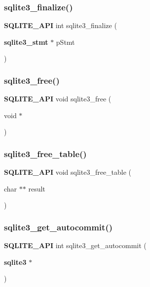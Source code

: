 \mbox{\label{sqlite3_8h_a801195c0f771d40bb4be1e40f3b88945}} 
\subsubsection{sqlite3\_finalize()}
{\footnotesize\ttfamily \textbf{ S\+Q\+L\+I\+T\+E\+\_\+\+A\+PI} int sqlite3\+\_\+finalize (\begin{DoxyParamCaption}\item[{\textbf{ sqlite3\+\_\+stmt} $\ast$}]{p\+Stmt }\end{DoxyParamCaption})}

\mbox{\label{sqlite3_8h_a6552349e36a8a691af5487999ab09519}} 
\subsubsection{sqlite3\_free()}
{\footnotesize\ttfamily \textbf{ S\+Q\+L\+I\+T\+E\+\_\+\+A\+PI} void sqlite3\+\_\+free (\begin{DoxyParamCaption}\item[{void $\ast$}]{ }\end{DoxyParamCaption})}

\mbox{\label{sqlite3_8h_ae8be703b19496650762f97721cae4841}} 
\subsubsection{sqlite3\_free\_table()}
{\footnotesize\ttfamily \textbf{ S\+Q\+L\+I\+T\+E\+\_\+\+A\+PI} void sqlite3\+\_\+free\+\_\+table (\begin{DoxyParamCaption}\item[{char $\ast$$\ast$}]{result }\end{DoxyParamCaption})}

\mbox{\label{sqlite3_8h_a86cb7d84e4181f9601a20f8e58c51e1f}} 
\subsubsection{sqlite3\_get\_autocommit()}
{\footnotesize\ttfamily \textbf{ S\+Q\+L\+I\+T\+E\+\_\+\+A\+PI} int sqlite3\+\_\+get\+\_\+autocommit (\begin{DoxyParamCaption}\item[{\textbf{ sqlite3} $\ast$}]{ }\end{DoxyParamCaption})}

